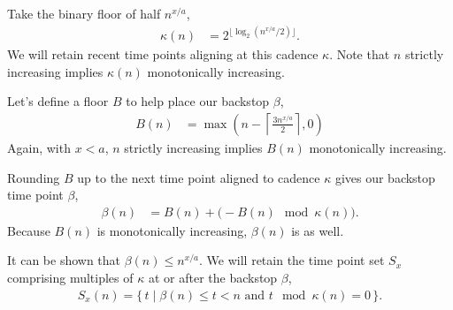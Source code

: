 Take the binary floor of half $n^{x/a}$,
\begin{align*}
  \kappa(n)
  &=
  2^{\lfloor \log_{2}(n^{x/a}/2) \rfloor}.
\end{align*}
We will retain recent time points aligning at this cadence $\kappa$.
Note that $n$ strictly increasing implies $\kappa(n)$ monotonically increasing.

Let's define a floor $B$ to help place our backstop $\beta$,
\begin{align*}
  B(n)
  &=
  \max \left(
    n - \left\lceil  \frac{3n^{x/a}}{2} \right\rceil,
    0
  \right)
\end{align*}
Again, with $x < a$, $n$ strictly increasing implies $B(n)$ monotonically increasing.

Rounding $B$ up to the next time point aligned to cadence $\kappa$ gives our backstop time point $\beta$,
\begin{align*}
  \beta(n)
  &=
  B(n) + \big(-B(n) \mod \kappa(n)\big).
\end{align*}
Because $B(n)$ is monotonically increasing, $\beta(n)$ is as well.

It can be shown that $\beta(n) \leq n^{x/a}$.
We will retain the time point set $S_x$ comprising multiples of $\kappa$ at or after the backstop $\beta$,
\begin{align*}
  S_x(n) = \{\, t \mid \beta(n) \leq t < n \text{ and } t \mod \kappa(n) = 0 \,\}.
\end{align*}

